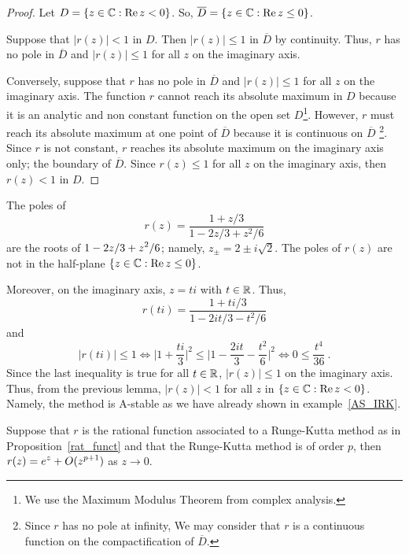 \begin{proof}
Let $D = \{ z\in\mathbb{C} : \operatorname{Re} z<0\}$.  So,
$\overline{D} =  \{ z\in\mathbb{C} : \operatorname{Re} z \leq 0\}$.

Suppose that $|r(z)| <1$ in $D$.  Then $|r(z)| \leq 1$ in
$\overline{D}$ by continuity.  Thus, $r$ has no pole in
$\overline{D}$ and $|r(z)| \leq 1$ for all $z$ on the imaginary axis.

Conversely, suppose that $r$ has no pole in $\overline{D}$ and
$|r(z)| \leq 1$ for all $z$ on the imaginary axis.  The function $r$
cannot reach its absolute
maximum in $D$ because it is an analytic and non constant function on
the open set $D$\footnote{We use the Maximum Modulus Theorem from
complex analysis.}.  However, $r$ must reach its absolute maximum at one
point of $\overline{D}$ because it is continuous on
$\overline{D}$ \footnote{Since $r$ has no pole at infinity, We may
consider that $r$ is a continuous function on the compactification 
of $\overline{D}$.}.  Since $r$ is not constant, $r$
reaches its absolute maximum on the imaginary axis only; the
boundary of $\overline{D}$.  Since $r(z) \leq 1$ for all $z$ on the
imaginary axis, then $r(z) < 1$ in $D$.
\end{proof}

\begin{egg}
The poles of
\[
r(z) = \frac{1+ z/3}{1-2z/3+z^2/6}
\]
are the roots of $\displaystyle 1-2z/3+z^2/6$; namely,
$z_{\pm} = 2\pm i\sqrt{2}$.  The poles of $r(z)$ are not in
the half-plane $\{ z\in\mathbb{C} : \operatorname{Re} z\leq 0\}$.

Moreover, on the imaginary axis, $z=ti$ with $t\in \mathbb{R}$. Thus,
\[
r(ti) = \frac{1+ti/3}{1-2it/3-t^2/6}
\]
and
\[
|r(ti)|\leq 1 \Leftrightarrow
\bigg| 1+\frac{ti}{3} \bigg|^2 \leq
\bigg| 1-\frac{2it}{3}-\frac{t^2}{6} \bigg|^2
\Leftrightarrow
0 \leq \frac{t^4}{36} \ .
\]
Since the last inequality is true for all $t \in \mathbb{R}$, $|r(z)|\leq 1$
on the imaginary axis.  Thus, from the previous lemma, $|r(z)| <1$ for
all $z$ in $\{z \in\mathbb{C} : \operatorname{Re} z<0\}$.  Namely, the method is
A-stable as we have already shown in example~\ref{AS_IRK}.
\end{egg}

\begin{lemma}
Suppose that $r$ is the rational function associated to a Runge-Kutta
method as in Proposition~\ref{rat_funct} and that the Runge-Kutta method is
of order $p$, then $\displaystyle r(z) = e^z +O(z^{p+1})$ as $z \rightarrow 0$.
\label{exp_approx}
\end{lemma}

